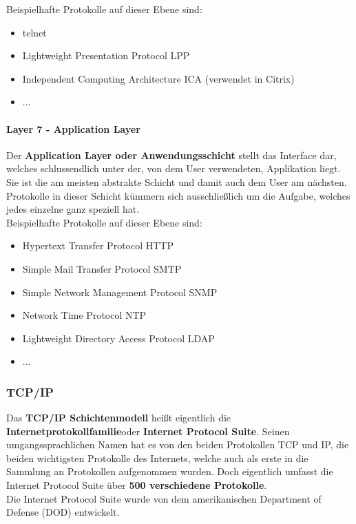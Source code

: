\documentclass[12pt,a4paper]{report}
\begin{document}
\begin{onehalfspace}
Beispielhafte Protokolle auf dieser Ebene sind:
\begin{itemize}
\item telnet
\item Lightweight Presentation Protocol LPP
\item Independent Computing Architecture ICA (verwendet in Citrix)
\item ...
\end{itemize}

\paragraph{Layer 7 - Application Layer}
Der \textbf{Application Layer oder Anwendungsschicht} stellt das Interface dar, welches schlussendlich unter der, von dem User verwendeten, Applikation liegt. Sie ist die am meisten abstrakte Schicht und damit auch dem User am nächsten. Protokolle in dieser Schicht kümmern sich ausschließlich um die Aufgabe, welches jedes einzelne ganz speziell hat.\\

Beispielhafte Protokolle auf dieser Ebene sind:
\begin{itemize}
\item Hypertext Transfer Protocol HTTP
\item Simple Mail Transfer Protocol SMTP
\item Simple Network Management Protocol SNMP
\item Network Time Protocol NTP
\item Lightweight Directory Access Protocol LDAP
\item ...
\end{itemize}
\subsubsection{TCP/IP}\label{sssec:tcpip}
Das \textbf{TCP/IP Schichtenmodell} heißt eigentlich die \glqq \textbf{Internetprotokollfamilie}\grqq  oder \glqq \textbf{Internet Protocol Suite}\grqq . Seinen umgangssprachlichen Namen hat es von den beiden Protokollen TCP und IP, die beiden wichtigsten Protokolle des Internets, welche auch als erste in die Sammlung an Protokollen aufgenommen wurden. Doch eigentlich umfasst die Internet Protocol Suite über \textbf{500 verschiedene Protokolle}.\\
Die Internet Protocol Suite wurde von dem amerikanischen Department of Defense (DOD) entwickelt.\\



\end{onehalfspace}
\end{document}
